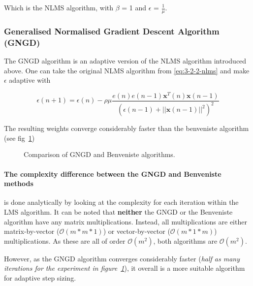 \documentclass[main.tex]{subfiles}
\begin{document}
Which is the NLMS algorithm, with $\beta$ = 1 and $\epsilon$ = $\frac{1}{\mu}$.



\subsubsection{Generalised Normalised Gradient Descent Algorithm (GNGD)}

The GNGD algorithm is an adaptive version of the NLMS algorithm introduced above. One can take the original NLMS algorithm from \ref{eq:3-2-2-nlms} and make $\epsilon$ adaptive with

\begin{equation}
\epsilon(n+1) = \epsilon(n) - \rho\mu\frac{e(n)e(n-1)\textbf{x}^T(n)\textbf{x}(n-1)}{(\epsilon(n-1)+||\textbf{x}(n-1)||^2)^2}
\end{equation}

The resulting weights converge considerably faster than the benveniste algorithm (see fig~\ref{fig:q3_2_c})

\begin{figure}[H]
	\centering 
	\resizebox{0.7\textwidth}{!}{}
	\caption{Comparison of GNGD and Benveniste algorithms.}
	\label{fig:q3_2_c}
\end{figure}

\paragraph{The complexity difference between the GNGD and Benveniste methods} is done analytically by looking at the complexity for each iteration within the LMS algorithm. It can be noted that \textbf{neither} the GNGD or the Benveniste algorithm have any matrix multiplications. Instead, all multiplications are either matrix-by-vector ($\mathcal{O}(m*m*1)$) or vector-by-vector ($\mathcal{O}(m*1*m)$) multiplications. As these are all of order $\mathcal{O}(m^2)$, both algorithms are $\mathcal{O}(m^2)$.

However, as the GNGD algorithm converges considerably faster (\textit{half as many iterations for the experiment in figure~\ref{fig:q3_2_c}}), it overall is a more suitable algorithm for adaptive step sizing.
\end{document}
